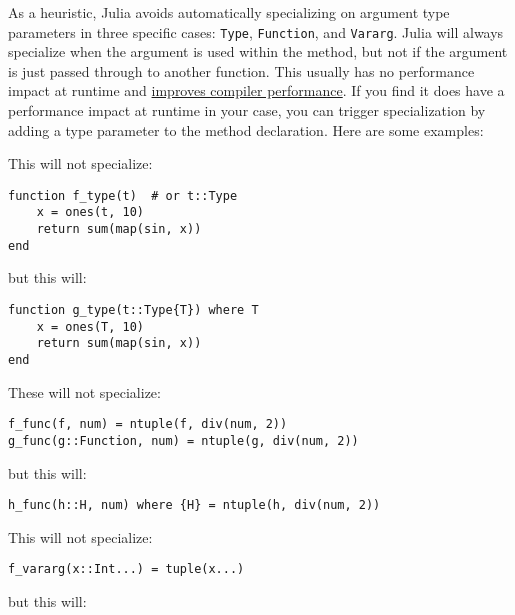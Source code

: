 As a heuristic, Julia avoids automatically specializing on argument type parameters in three specific cases: \texttt{Type}, \texttt{Function}, and \texttt{Vararg}. Julia will always specialize when the argument is used within the method, but not if the argument is just passed through to another function. This usually has no performance impact at runtime and \hyperlink{14494557220692677892}{improves compiler performance}. If you find it does have a performance impact at runtime in your case, you can trigger specialization by adding a type parameter to the method declaration. Here are some examples:



This will not specialize:




\begin{verbatim}
function f_type(t)  # or t::Type
    x = ones(t, 10)
    return sum(map(sin, x))
end
\end{verbatim}



but this will:




\begin{verbatim}
function g_type(t::Type{T}) where T
    x = ones(T, 10)
    return sum(map(sin, x))
end
\end{verbatim}



These will not specialize:




\begin{verbatim}
f_func(f, num) = ntuple(f, div(num, 2))
g_func(g::Function, num) = ntuple(g, div(num, 2))
\end{verbatim}



but this will:




\begin{verbatim}
h_func(h::H, num) where {H} = ntuple(h, div(num, 2))
\end{verbatim}



This will not specialize:




\begin{verbatim}
f_vararg(x::Int...) = tuple(x...)
\end{verbatim}



but this will:




